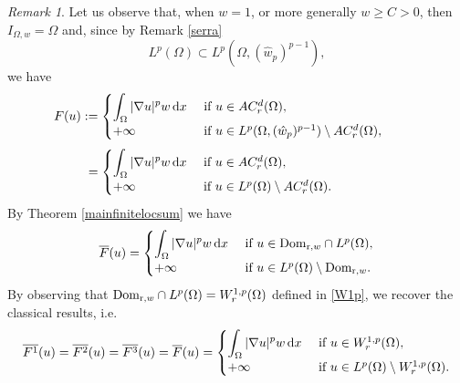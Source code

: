 \documentclass[11pt,leqno]{amsart}
\theoremstyle{remark}
\newtheorem{oss}[teo]{Remark}
\theoremstyle{definition}
\theoremstyle{definition}
\newcommand{\wstar}{{\hat w}}
\def\de{{\rm d}}
\begin{document}
\begin{oss}
Let us observe that, when $w=1$, or more generally $w\geq C>0$, then $I_{\Omega,w}=\Omega$ and, since by Remark \ref{serra}
\begin{equation*}\label{include1}
L^p(\Omega)\subset L^{p}(\Omega,(\wstar_{p})^{p-1}),
\end{equation*}
we have
\begin{equation*}
\!\!\!\!\!\! \!\!\! \!\!\!\!\!\! \!\!\!   F(u):=
\begin{cases}
\displaystyle\int_{\Omega} |\nabla u|^p w\,\de x &\text{ if } u\in AC_{r}^{d}(\Omega),\\
+\infty & \text{ if } u\in L^p(\Omega,(\wstar_{p})^{p-1})\setminus AC_{r}^{d}(\Omega),
\end{cases}
\end{equation*}
\begin{equation*}
\!\!\!\!\!\!\!\!\!\!\!\!\!\!\!\!\!\!\!\!\!\!\!\!\! =
\begin{cases}
\displaystyle\int_{\Omega} |\nabla u|^p w\,\de x &\text{ if } u\in AC_{r}^{d}(\Omega),\\
+\infty & \text{ if } u\in L^p(\Omega)\setminus AC_{r}^{d}(\Omega).
\end{cases}
\end{equation*}
By Theorem \ref{mainfinitelocsum}  we have
\begin{equation*}
\overline{F}(u)=
\begin{cases}
\displaystyle\int_{\Omega} |\nabla u|^{p} w\,\de x &\text{ if } u\in {\rm{Dom}}_{{\mathrm r},w}\cap L^{p}(\Omega),\\
+\infty & \text{ if } u\in L^{p}(\Omega)\setminus {\rm{Dom}}_{{\mathrm r},w} .
\end{cases}
\end{equation*}  
By observing that ${\rm{Dom}}_{{\mathrm r},w}\cap L^{p}(\Omega)=W_{r}^{1,p}(\Omega)$ defined in \eqref{W1p},
we recover the classical results, i.e.
$$
\overline{F^1}(u)=\overline{F^2}(u)=\overline{F^3}(u)=\overline{F}(u)
=
\begin{cases}
\displaystyle\int_{\Omega} |\nabla u|^p w\,\de x &\text{ if } u\in W_{r}^{1,p}(\Omega),\\
+\infty & \text{ if } u\in L^p(\Omega)\setminus W_{r}^{1,p}(\Omega).
\end{cases}
$$
\end{oss}
\end{document}
